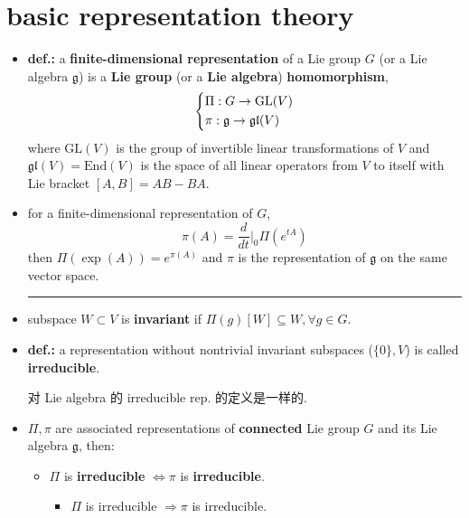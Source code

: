 \section{basic representation theory} \label{5.2}
\begin{itemize}
	\item \textbf{def.:} a \textbf{finite-dimensional representation} of a Lie group $G$ (or a Lie algebra $\mathfrak{g}$) is a \textbf{Lie group} (or a \textbf{Lie algebra}) \textbf{homomorphism},
	\begin{equation}
		\begin{dcases}
			\Pi : G \rightarrow \mathrm{GL}(V) \\
			\pi : \mathfrak{g} \rightarrow \mathfrak{gl}(V)
		\end{dcases}
	\end{equation}
	where $\mathrm{GL}(V)$ is the group of invertible linear transformations of $V$ and $\mathfrak{gl}(V) = \mathrm{End}(V)$ is the space of all linear operators from $V$ to itself with Lie bracket $[A, B] = A B - B A$.
	
	\item for a finite-dimensional representation of $G$,
	\begin{equation}
		\pi(A) = \frac{d}{dt} \Big|_0 \Pi(e^{t A})
	\end{equation}
	then $\Pi(\exp(A)) = e^{\pi(A)}$ and $\pi$ is the representation of $\mathfrak{g}$ on the same vector space.
	
	\noindent\rule[0.5ex]{\linewidth}{0.5pt} %
	
	\item subspace $W \subset V$ is \textbf{invariant} if $\Pi(g)[W] \subseteq W, \forall g \in G$.
	
	\item \textbf{def.:} a representation without nontrivial invariant subspaces ($\{0\}, V$) is called \textbf{irreducible}.
	
	对 Lie algebra 的 irreducible rep. 的定义是一样的.
	
	\item $\Pi, \pi$ are associated representations of \textbf{connected} Lie group $G$ and its Lie algebra $\mathfrak{g}$, then:
	\begin{itemize}
		\item $\Pi$ is \textbf{irreducible} $\iff \pi$ is \textbf{irreducible}.
		
		\begin{tcolorbox}[title=proof:]
			\begin{itemize}
				\item $\Pi$ is irreducible $\Longrightarrow \pi$ is irreducible.
				

\end{itemize}
\end{tcolorbox}
\end{itemize}
\end{itemize}
